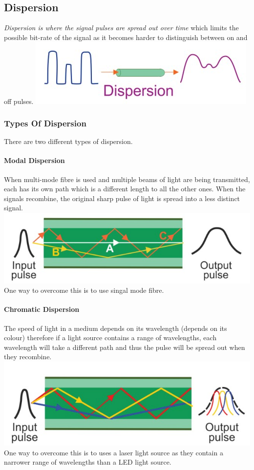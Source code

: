 \documentclass[a4paper,11pt, twocolumn]{article}
\begin{document}
\subsection{Dispersion}
\textit{Dispersion is where the signal pulses are spread out over time} which limits the possible bit-rate of the signal as it becomes harder to distinguish between on and off pulses.
\includegraphics[width=\linewidth]{dispersion.jpg}
\subsubsection{Types Of Dispersion}
There are two different types of dispersion.
\paragraph{Modal Dispersion} 
When multi-mode fibre is used and multiple beams of light are being transmitted, each has its own path which is a different length to all the other ones. When the signals recombine, the original sharp pulse of light is spread into a less distinct signal.\\
\includegraphics[width=\linewidth]{modalDisp.jpg}\\
One way to overcome this is to use singal mode fibre.
\paragraph{Chromatic Dispersion}
The speed of light in a medium depends on its wavelength (depends on its colour) therefore if a light source contains a range of wavelengths, each wavelength will take a different path and thus the pulse will be spread out when they recombine.\\
\includegraphics[width=\linewidth]{chromaticDisp.jpg}\\
One way to overcome this is to uses a laser light source as they contain a narrower range of wavelengths than a LED light source.
\end{document}
